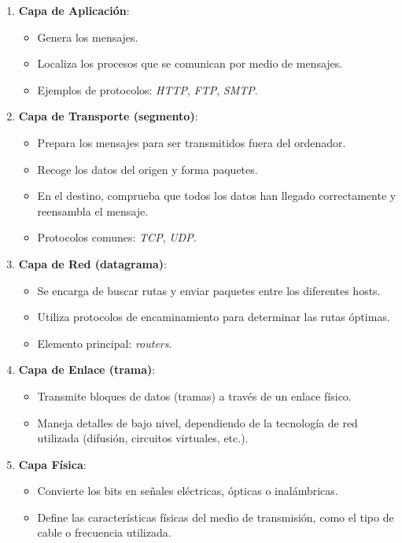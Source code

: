 \documentclass{article}
\begin{document}
\begin{enumerate}
    \item \textbf{Capa de Aplicación}: 
    \begin{itemize}
        \item Genera los mensajes.
        \item Localiza los procesos que se comunican por medio de mensajes.
        \item Ejemplos de protocolos: \textit{HTTP}, \textit{FTP}, \textit{SMTP}.
    \end{itemize}
    
    \item \textbf{Capa de Transporte (segmento)}:
    \begin{itemize}
        \item Prepara los mensajes para ser transmitidos fuera del ordenador.
        \item Recoge los datos del origen y forma paquetes.
        \item En el destino, comprueba que todos los datos han llegado correctamente y reensambla el mensaje.
        \item Protocolos comunes: \textit{TCP}, \textit{UDP}.
    \end{itemize}
    
    \item \textbf{Capa de Red (datagrama)}:
    \begin{itemize}
        \item Se encarga de buscar rutas y enviar paquetes entre los diferentes hosts.
        \item Utiliza protocolos de encaminamiento para determinar las rutas óptimas.
        \item Elemento principal: \textit{routers}.
    \end{itemize}
    
    \item \textbf{Capa de Enlace (trama)}:
    \begin{itemize}
        \item Transmite bloques de datos (tramas) a través de un enlace físico.
        \item Maneja detalles de bajo nivel, dependiendo de la tecnología de red utilizada (difusión, circuitos virtuales, etc.).
    \end{itemize}
    
    \item \textbf{Capa Física}:
    \begin{itemize}
        \item Convierte los bits en señales eléctricas, ópticas o inalámbricas.
        \item Define las características físicas del medio de transmisión, como el tipo de cable o frecuencia utilizada.
    \end{itemize}
\end{enumerate}
\end{document}
